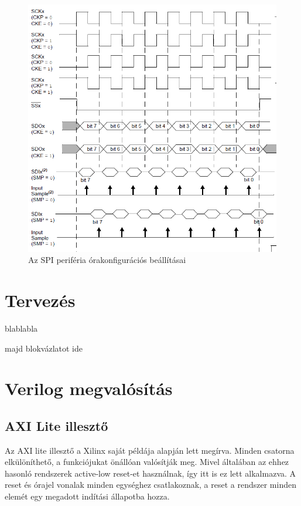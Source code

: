 \documentclass[a4paper,11pt]{article}
\begin{document}
\begin{figure}[h!]
	\begin{center}
	\includegraphics[scale=2.3]{spi_clkdiag.png}
	\caption{Az SPI periféria órakonfigurációs beállításai}
	\label{fig:spi_clkdiag}
	\end{center}
\end{figure}

\section{Tervezés}

blablabla

majd blokvázlatot ide

\section{Verilog megvalósítás}

\subsection{AXI Lite illesztő}
Az AXI lite illesztő a Xilinx saját példája alapján lett megírva. Minden csatorna elkülöníthető, a funkciójukat önállóan valósítják meg. Mivel általában az ehhez hasonló rendszerek active-low reset-et használnak, így itt is ez lett alkalmazva. A reset és órajel vonalak minden egységhez csatlakoznak, a reset a rendszer minden elemét egy megadott indítási állapotba hozza.
\end{document}
